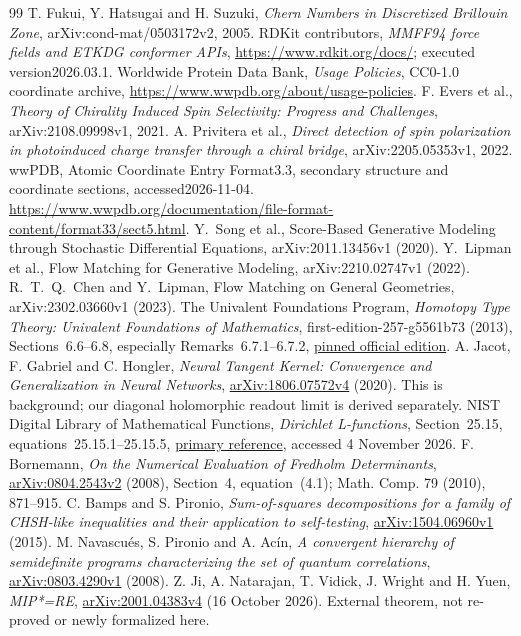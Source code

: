 \documentclass[11pt]{article}
\theoremstyle{definition}\newtheorem{definition}[theorem]{Definition}
\theoremstyle{remark}\newtheorem{remark}[theorem]{Remark}
\begin{document}
\begin{thebibliography}{99}
 T. Fukui, Y. Hatsugai and H. Suzuki,
\emph{Chern Numbers in Discretized Brillouin Zone},
arXiv:cond-mat/0503172v2, 2005.
 RDKit contributors,
\emph{MMFF94 force fields and ETKDG conformer APIs},
\url{https://www.rdkit.org/docs/}; executed version2026.03.1.
 Worldwide Protein Data Bank,
\emph{Usage Policies}, CC0-1.0 coordinate archive,
\url{https://www.wwpdb.org/about/usage-policies}.
 F. Evers et al.,
\emph{Theory of Chirality Induced Spin Selectivity: Progress and Challenges},
arXiv:2108.09998v1, 2021.
 A. Privitera et al.,
\emph{Direct detection of spin polarization in photoinduced charge transfer
through a chiral bridge}, arXiv:2205.05353v1, 2022.
 wwPDB, Atomic Coordinate Entry Format3.3, secondary structure and coordinate sections, accessed2026-11-04. \url{https://www.wwpdb.org/documentation/file-format-content/format33/sect5.html}.
 Y.~Song et al., Score-Based Generative Modeling through Stochastic Differential Equations, arXiv:2011.13456v1 (2020).
 Y.~Lipman et al., Flow Matching for Generative Modeling, arXiv:2210.02747v1 (2022).
 R.~T.~Q.~Chen and Y.~Lipman, Flow Matching on General Geometries, arXiv:2302.03660v1 (2023).
 The Univalent Foundations Program, \emph{Homotopy Type Theory: Univalent Foundations of Mathematics}, first-edition-257-g5561b73 (2013), Sections~6.6--6.8, especially Remarks~6.7.1--6.7.2, \href{https://homotopytypetheory.org/wp-content/uploads/2013/03/hott-online-257-g5561b73.pdf}{pinned official edition}.
 A. Jacot, F. Gabriel and C. Hongler, \emph{Neural Tangent Kernel: Convergence and Generalization in Neural Networks}, \href{https://arxiv.org/abs/1806.07572v4}{arXiv:1806.07572v4} (2020). This is background; our diagonal holomorphic readout limit is derived separately.
 NIST Digital Library of Mathematical Functions, \emph{Dirichlet L-functions}, Section~25.15, equations~25.15.1--25.15.5, \href{https://dlmf.nist.gov/25.15}{primary reference}, accessed 4 November 2026.
 F. Bornemann, \emph{On the Numerical Evaluation of Fredholm Determinants}, \href{https://arxiv.org/abs/0804.2543v2}{arXiv:0804.2543v2} (2008), Section~4, equation~(4.1); Math. Comp. 79 (2010), 871--915.
 C. Bamps and S. Pironio, \emph{Sum-of-squares decompositions for a family of CHSH-like inequalities and their application to self-testing}, \href{https://arxiv.org/abs/1504.06960v1}{arXiv:1504.06960v1} (2015).
 M. Navascu\'es, S. Pironio and A. Ac\'in, \emph{A convergent hierarchy of semidefinite programs characterizing the set of quantum correlations}, \href{https://arxiv.org/abs/0803.4290v1}{arXiv:0803.4290v1} (2008).
 Z. Ji, A. Natarajan, T. Vidick, J. Wright and H. Yuen, \emph{MIP*=RE}, \href{https://arxiv.org/abs/2001.04383v4}{arXiv:2001.04383v4} (16 October 2026). External theorem, not re-proved or newly formalized here.
\end{thebibliography}
\end{document}
